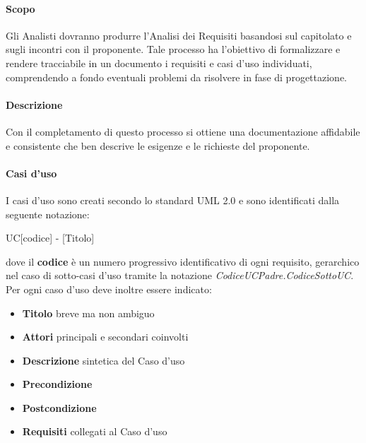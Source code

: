 \documentclass[12pt,a4paper]{article}
\begin{document}
\paragraph{Scopo}
Gli Analisti dovranno produrre l’Analisi dei Requisiti basandosi sul capitolato e sugli incontri con il proponente. Tale processo ha l’obiettivo di formalizzare e rendere tracciabile in un documento i requisiti e casi d’uso individuati, comprendendo a fondo eventuali problemi da risolvere in fase di progettazione.

\paragraph{Descrizione}
Con il completamento di questo processo si ottiene una documentazione affidabile e consistente che ben descrive le esigenze e le richieste del proponente.

\paragraph{Casi d'uso}
I casi d'uso sono creati secondo lo standard UML 2.0 e sono identificati dalla seguente notazione:
\begin{center}
UC[codice] - [Titolo]
\end{center}
dove il \textbf{codice} è un numero progressivo identificativo di ogni requisito, gerarchico nel  caso di sotto-casi d'uso tramite la notazione \textit{CodiceUCPadre.CodiceSottoUC}. Per ogni caso d'uso deve inoltre essere indicato:
\begin{itemize}
\item \textbf{Titolo} breve ma non ambiguo
\item \textbf{Attori} principali e secondari coinvolti
\item \textbf{Descrizione} sintetica del Caso d'uso
\item \textbf{Precondizione}
\item \textbf{Postcondizione}
\item \textbf{Requisiti} collegati al Caso d'uso
\end{itemize}
\end{document}
